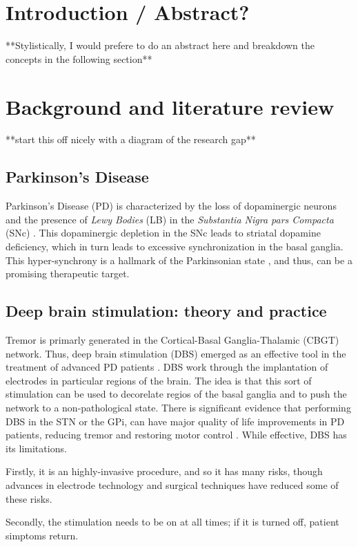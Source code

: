 \section{Introduction / Abstract?}
**Stylistically, I would prefere to do an abstract here and breakdown the concepts in the following
section**
\section{Background and literature review}
**start this off nicely with a diagram of the research gap**

\subsection{Parkinson's Disease}
Parkinson's Disease (PD) is characterized by the loss of dopaminergic neurons and the presence of
\emph{Lewy Bodies} (LB) in the \emph{Substantia Nigra pars Compacta} (SNc)
\cite{del2018advances}. This dopaminergic depletion in the SNc leads to striatal dopamine
deficiency, which in turn leads to excessive synchronization in the basal ganglia. This
hyper-synchrony is a hallmark of the Parkinsonian state \cite{hammond2007pathological,
	helmich2012cerebral}, and thus, can be a promising therapeutic target.


\subsection{Deep brain stimulation: theory and practice}
Tremor is primarly generated in the Cortical-Basal Ganglia-Thalamic (CBGT) network. Thus, deep
brain stimulation (DBS) emerged as an effective tool in the treatment of advanced PD patients
\cite{del2018advances}. DBS work through the implantation of electrodes in particular regions
of the brain. The idea is that this sort of stimulation can be used to decorelate regios of the
basal ganglia and to push the network to a non-pathological state. There is significant evidence
that performing DBS in the STN or the GPi, can have major quality of life improvements in
PD patients, reducing tremor and restoring motor control \cite{rodriguez2005bilateral}. While
effective, DBS has its limitations.

Firstly, it is an highly-invasive procedure, and so it has many risks, though advances in
electrode technology and surgical techniques have reduced some of these risks.

Secondly, the stimulation needs to be on at all times; if it is turned off, patient simptoms
return.

